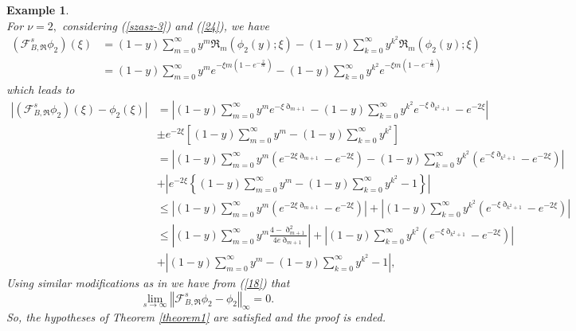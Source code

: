 \documentclass{amsart}
\theoremstyle{plain}
\newtheorem{example}{Example}
\numberwithin{equation}{section}
\begin{document}
\begin{example}
\[\]
For $\nu=2,$ considering (\ref{szasz-3}) and (\ref{24}), we have%
\begin{align*}
(%
\mathcal{F}%
_{B,\Re}^{s}\phi_{2})(\xi) &  =(1-y)\sum_{m=0}^{\infty}y^{m}\Re_{m}(\phi
_{2}\left(  y\right)  ;\xi)-\left(  1-y\right)  \sum_{k=0}^{\infty}y^{k^{2}%
}\Re_{m}(\phi_{2}\left(  y\right)  ;\xi)\\
&  =(1-y)\sum_{m=0}^{\infty}y^{m}e^{-\xi m(1-e^{-\frac{2}{m}})}-\left(
1-y\right)  \sum_{k=0}^{\infty}y^{k^{2}}e^{-\xi m(1-e^{-\frac{2}{m}})}%
\end{align*}
which leads to%
\begin{align}
\left \vert (%
\mathcal{F}%
_{B,\Re}^{s}\phi_{2})(\xi)-\phi_{2}(\xi)\right \vert  &  =\left \vert
(1-y)\sum_{m=0}^{\infty}y^{m}e^{-\xi \eth _{m+1}}-\left(  1-y\right)
\sum_{k=0}^{\infty}y^{k^{2}}e^{-\xi \eth _{k^{2}+1}}-e^{-2\xi}\right \vert
\nonumber \\
&  \pm e^{-2\xi}\left[  (1-y)\sum_{m=0}^{\infty}y^{m}-\left(  1-y\right)
\sum_{k=0}^{\infty}y^{k^{2}}\right]  \nonumber \\
&  =\left \vert (1-y)\sum_{m=0}^{\infty}y^{m}\left(  e^{-2\xi \eth _{m+1}%
}-e^{-2\xi}\right)  -\left(  1-y\right)  \sum_{k=0}^{\infty}y^{k^{2}}\left(
e^{-\xi \eth _{k^{2}+1}}-e^{-2\xi}\right)  \right \vert \nonumber \\
&  +\left \vert e^{-2\xi}\left \{  (1-y)\sum_{m=0}^{\infty}y^{m}-\left(
1-y\right)  \sum_{k=0}^{\infty}y^{k^{2}}-1\right \}  \right \vert \nonumber \\
&  \leq \left \vert (1-y)\sum_{m=0}^{\infty}y^{m}\left(  e^{-2\xi \eth _{m+1}%
}-e^{-2\xi}\right)  \right \vert +\left \vert \left(  1-y\right)  \sum
_{k=0}^{\infty}y^{k^{2}}\left(  e^{-\xi \eth _{k^{2}+1}}-e^{-2\xi}\right)
\right \vert \nonumber \\
&  \leq \left \vert (1-y)\sum_{m=0}^{\infty}y^{m}\frac{4-\eth _{m+1}^{2}%
}{4e\eth _{m+1}}\right \vert +\left \vert \left(  1-y\right)  \sum_{k=0}%
^{\infty}y^{k^{2}}\left(  e^{-\xi \eth _{k^{2}+1}}-e^{-2\xi}\right)
\right \vert \nonumber \\
&  +\left \vert (1-y)\sum_{m=0}^{\infty}y^{m}-\left(  1-y\right)  \sum
_{k=0}^{\infty}y^{k^{2}}-1\right \vert ,\label{18}%
\end{align}
Using similar modifications as in \cite{ulucay-un} we have from (\ref{18})
that%
\[
\lim_{s\rightarrow \infty}\left \Vert
\mathcal{F}%
_{B,\Re}^{s}\phi_{2}-\phi_{2}\right \Vert _{\infty}=0\text{.}%
\]
So, the hypotheses of Theorem \ref{theorem1} are satisfied and the proof is ended.
\end{example}
\end{document}
